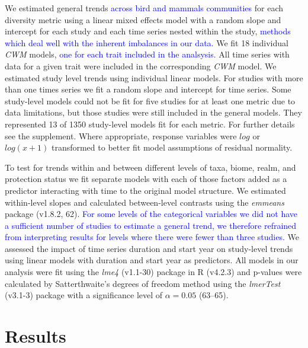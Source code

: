 \documentclass{article}
\begin{document}
We estimated general trends
\textcolor{blue}{across bird and mammals communities} for each diversity
metric using a linear mixed effects model with a random slope and
intercept for each study and each time series nested within the study,
\textcolor{blue}{methods which deal well with the inherent imbalances in our data.}
We fit 18 individual \emph{CWM} models,
\textcolor{blue}{one for each trait included in the analsysis}. All time
series with data for a given trait were included in the corresponding
\emph{CWM} model. We estimated study level trends using individual
linear models. For studies with more than one times series we fit a
random slope and intercept for time series. Some study-level models
could not be fit for five studies for at least one metric due to data
limitations, but those studies were still included in the general
models. They represented 13 of 1350 study-level models fit for each
metric. For further details see the supplement. Where appropriate,
response variables were \(log\) or \(log(x+1)\) transformed to better
fit model assumptions of residual normality.

To test for trends within and between different levels of taxa, biome,
realm, and protection status we fit separate models with each of those
factors added as a predictor interacting with time to the original model
structure. We estimated within-level slopes and calculated between-level
contrasts using the \emph{emmeans} package (v1.8.2, 62).
\textcolor{blue}{For some levels of the categorical variables we did not have a sufficient number of studies to estimate a general trend, we therefore refrained from interpreting results for levels where there were fewer than three studies.}
We assessed the impact of time series duration and start year on
study-level trends using linear models with duration and start year as
predictors. All models in our analysis were fit using the \emph{lme4}
(v1.1-30) package in R (v4.2.3) and p-values were calculated by
Satterthwaite's degrees of freedom method using the \emph{lmerTest}
(v3.1-3) package with a significance level of \(\alpha = 0.05\)
(63--65).

\hypertarget{results}{%
\section{Results}\label{results}}
\end{document}
